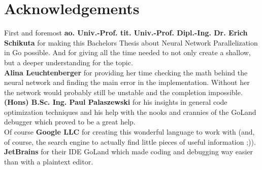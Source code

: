 \documentclass[11pt]{article}
\begin{document}
\section*{Acknowledgements}
First and foremost \textbf{ao. Univ.-Prof. tit. Univ.-Prof. Dipl.-Ing. Dr. Erich Schikuta} for making this Bachelors Thesis about Neural Network Parallelization in Go possible. And for giving all the time needed to not only create a shallow, but a deeper understanding for the topic.\\
\textbf{Alina Leuchtenberger} for providing her time checking the math behind the neural network and finding the main error in the implementation. Without her the network would probably still be unstable and the completion impossible.\\
\textbf{(Hons) B.Sc. Ing. Paul Palaszewski} for his insights in general code optimization techniques and his help with the nooks and crannies of the GoLand debugger which proved to be a great help.\\
Of course \textbf{Google LLC} for creating this wonderful language to work with (and, of course, the search engine to actually find little pieces of useful information ;)).\\
\textbf{JetBrains} for their IDE GoLand which made coding and debugging way easier than with a plaintext editor.

\newpage


\end{document}
